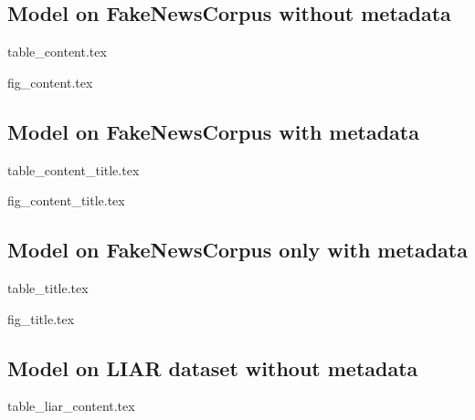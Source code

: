 \documentclass{article}
\begin{document}
\begin{landscape}
    \subsection*{Model on FakeNewsCorpus without metadata}
    \begin{adjustbox}{scale = 0.75}
        \centering      
        {table_content.tex}
    \end{adjustbox}
\end{landscape}

\newpage

{fig_content.tex}


\newpage


\begin{landscape}
    \subsection*{Model on FakeNewsCorpus with metadata}
    \begin{adjustbox}{scale = 0.75}
        \centering      
        {table_content_title.tex}
    \end{adjustbox}
\end{landscape}

\newpage

{fig_content_title.tex}


\newpage


\begin{landscape}
    \subsection*{Model on FakeNewsCorpus only with metadata}
    \begin{adjustbox}{scale = 0.75}
        \centering      
        {table_title.tex}
    \end{adjustbox}
\end{landscape}

\newpage

{fig_title.tex}


\newpage


\begin{landscape}
    \subsection*{Model on LIAR dataset without metadata}
    \begin{adjustbox}{scale = 0.75}
        \centering      
        {table_liar_content.tex}
    \end{adjustbox}
\end{landscape}
\end{document}
